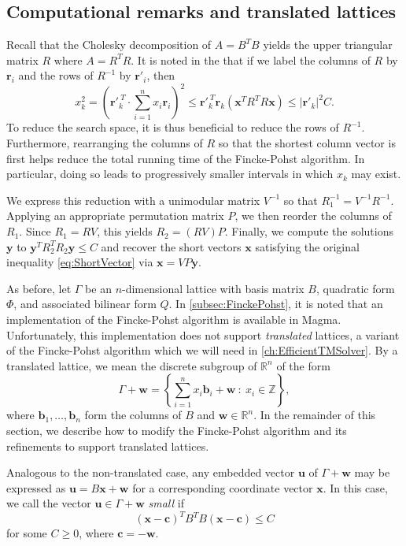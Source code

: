 \documentclass[11pt]{report}
\theoremstyle{definition}
\begin{document}
\subsection{Computational remarks and translated lattices}
\label{subsec:FinckePohstRemarks}

Recall that the Cholesky decomposition of $A = B^TB$ yields the upper triangular matrix $R$ where $A = R^TR$. It is noted in the \cite{FP} that if we label the columns of $R$ by $\mathbf{r}_i$ and the rows of $R^{-1}$ by $\mathbf{r}'_i$, then
\[x_k^2 = \left( \mathbf{r}'^{\ T}_k \cdot \sum_{i=1}^n x_i \mathbf{r}_i \right)^2 \leq \mathbf{r}'^{\ T}_k \mathbf{r}_k (\mathbf{x}^TR^TR\mathbf{x}) \leq | \mathbf{r}'_k |^2C.\]
To reduce the search space, it is thus beneficial to reduce the rows of $R^{-1}$. Furthermore, rearranging the columns of $R$ so that the shortest column vector is first helps reduce the total running time of the Fincke-Pohst algorithm. In particular, doing so leads to progressively smaller intervals in which $x_k$ may exist.

We express this reduction with a unimodular matrix $V^{-1}$ so that $R_1^{-1} = V^{-1}R^{-1}$. Applying an appropriate permutation matrix $P$, we then reorder the columns of $R_1$. Since $R_1 = RV$, this yields $R_2 = (RV)P$. Finally, we compute the solutions $\mathbf{y}$ to $\mathbf{y}^TR_2^TR_2\mathbf{y}\leq C$ and recover the short vectors $\mathbf{x}$ satisfying the original inequality \eqref{eq:ShortVector} via $\mathbf{x} = VP\mathbf{y}$.

As before, let $\Gamma$ be an $n$-dimensional lattice with basis matrix $B$, quadratic form $\Phi$, and associated bilinear form $Q$. In \autoref{subsec:FinckePohst}, it is noted that an implementation of the Fincke-Pohst algorithm is available in Magma. Unfortunately, this implementation does not support \textit{translated} lattices, a variant of the Fincke-Pohst algorithm which we will need in \autoref{ch:EfficientTMSolver}. By a translated lattice, we mean the discrete subgroup of $\mathbb{R}^n$ of the form
\[\Gamma + \mathbf{w} = \left\{ \sum_{i=1}^n x_i \mathbf{b}_i + \mathbf{w}\ : \ x_i \in \mathbb{Z} \right\},\]
where $\mathbf{b}_1, \dots, \mathbf{b}_n$ form the columns of $B$ and $\mathbf{w} \in \mathbb{R}^n$. In the remainder of this section, we describe how to modify the Fincke-Pohst algorithm and its refinements to support translated lattices.

Analogous to the non-translated case, any embedded vector $\mathbf{u}$ of $\Gamma + \mathbf{w}$ may be expressed as $\mathbf{u} = B\mathbf{x} + \mathbf{w}$ for a corresponding coordinate vector $\mathbf{x}$. In this case, we call the vector $\mathbf{u} \in \Gamma + \mathbf{w}$ \textit{small} if
\begin{equation} \label{eq:TransShortVector}
(\mathbf{x}-\mathbf{c})^TB^TB(\mathbf{x}-\mathbf{c}) \leq C
\end{equation}
for some $C \geq 0$, where $\mathbf{c} = -\mathbf{w}$.
\end{document}
